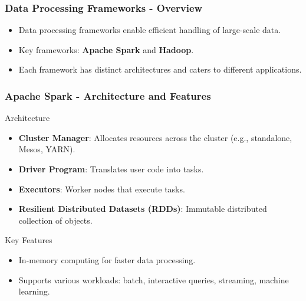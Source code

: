 \documentclass[aspectratio=169]{beamer}
\begin{document}
\begin{frame}[fragile]
    \frametitle{Data Processing Frameworks - Overview}
    \begin{itemize}
        \item Data processing frameworks enable efficient handling of large-scale data.
        \item Key frameworks: \textbf{Apache Spark} and \textbf{Hadoop}.
        \item Each framework has distinct architectures and caters to different applications.
    \end{itemize}
\end{frame}

\begin{frame}[fragile]
    \frametitle{Apache Spark - Architecture and Features}
    \begin{block}{Architecture}
        \begin{itemize}
            \item \textbf{Cluster Manager}: Allocates resources across the cluster (e.g., standalone, Mesos, YARN).
            \item \textbf{Driver Program}: Translates user code into tasks.
            \item \textbf{Executors}: Worker nodes that execute tasks.
            \item \textbf{Resilient Distributed Datasets (RDDs)}: Immutable distributed collection of objects.
        \end{itemize}
    \end{block}
    \begin{block}{Key Features}
        \begin{itemize}
            \item In-memory computing for faster data processing.
            \item Supports various workloads: batch, interactive queries, streaming, machine learning.
        \end{itemize}
    \end{block}
\end{frame}
\end{document}
